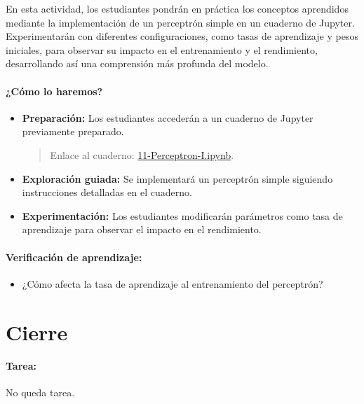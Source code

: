 \documentclass[a4,11pt]{aleph-notas}
\begin{document}
En esta actividad, los estudiantes pondrán en práctica los conceptos aprendidos mediante la implementación de un perceptrón simple en un cuaderno de Jupyter. Experimentarán con diferentes configuraciones, como tasas de aprendizaje y pesos iniciales, para observar su impacto en el entrenamiento y el rendimiento, desarrollando así una comprensión más profunda del modelo.

\paragraph{¿Cómo lo haremos?}  
\begin{itemize}[leftmargin=*]
    \item \textbf{Preparación:} Los estudiantes accederán a un cuaderno de Jupyter previamente preparado.
    \begin{quote}
        Enlace al cuaderno: \href{https://colab.research.google.com/github/andres-merino/AprendizajeAutomaticoInicial-05-N0105/blob/main/2-Notebooks/11-Perceptron-I.ipynb}{11-Perceptron-I.ipynb}.
    \end{quote}
    \item \textbf{Exploración guiada:} Se implementará un perceptrón simple siguiendo instrucciones detalladas en el cuaderno.
    \item \textbf{Experimentación:} Los estudiantes modificarán parámetros como tasa de aprendizaje para observar el impacto en el rendimiento.
\end{itemize}

\paragraph{Verificación de aprendizaje:}  
\begin{itemize}[leftmargin=*]
    \item ¿Cómo afecta la tasa de aprendizaje al entrenamiento del perceptrón?
\end{itemize}

\section*{Cierre}

\paragraph{Tarea:}
    No queda tarea.
\end{document}
